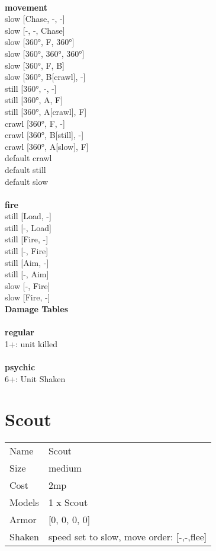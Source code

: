 \ \\ {\bf movement } \\
slow [Chase, -, -] \\
slow [-, -, Chase] \\
slow [360°, F, 360°] \\
slow [360°, 360°, 360°] \\
slow [360°, F, B] \\
slow [360°, B[crawl], -] \\
still [360°, -, -] \\
still [360°, A, F] \\
still [360°, A[crawl], F] \\
crawl [360°, F, -] \\
crawl [360°, B[still], -] \\
crawl [360°, A[slow], F] \\
default crawl \\
default still \\
default slow \\
\ \\ {\bf fire } \\
still [Load, -] \\
still [-, Load] \\
still [Fire, -] \\
still [-, Fire] \\
still [Aim, -] \\
still [-, Aim] \\
slow [-, Fire] \\
slow [Fire, -] \\


{\bf Damage Tables} \\
\ \\ {\bf regular } \\
1+: unit killed \\
\ \\ {\bf psychic } \\
6+: Unit Shaken \\










\pagebreak\pagebreak

\section{ Scout }

\begin{tabular}{ll}
  Name & Scout \\
  Size & medium\\
  Cost & 2mp\\
  Models & 1 x Scout\\
  Armor & [0, 0, 0, 0]\\
  Shaken & speed set to slow, move order: [-,-,flee]\\
\end{tabular}

